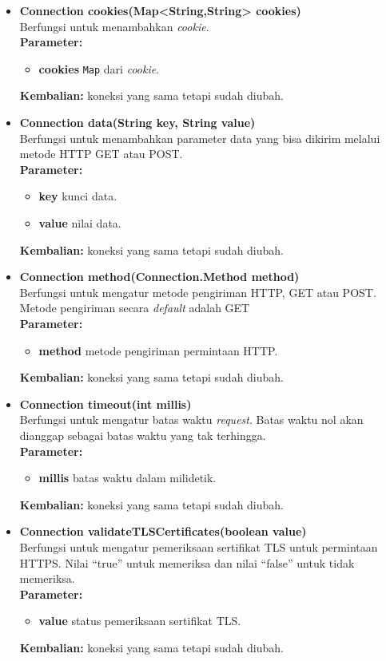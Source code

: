 \begin{itemize}
	\item \textbf{Connection cookies(Map<String,String> cookies)} \\
		Berfungsi untuk menambahkan \textit{cookie}. \\
		\textbf{Parameter:}
		\begin{itemize}
			\item \textbf{cookies} \texttt{Map} dari \textit{cookie}.
		\end{itemize}
		\textbf{Kembalian:} koneksi yang sama tetapi sudah diubah.
		
		\item \textbf{Connection data(String key, String value)} \\
		Berfungsi untuk menambahkan parameter data yang bisa dikirim melalui metode HTTP GET atau POST. \\
		\textbf{Parameter:}
		\begin{itemize}
			\item \textbf{key} kunci data.
			\item \textbf{value} nilai data.
		\end{itemize}
		\textbf{Kembalian:} koneksi yang sama tetapi sudah diubah.
		
		\item \textbf{Connection method(Connection.Method method)} \\
		Berfungsi untuk mengatur metode pengiriman HTTP, GET atau POST. Metode pengiriman secara \textit{default} adalah GET\\
		\textbf{Parameter:}
		\begin{itemize}
			\item \textbf{method} metode pengiriman permintaan HTTP.
		\end{itemize}
		\textbf{Kembalian:} koneksi yang sama tetapi sudah diubah.
		
		\item \textbf{Connection timeout(int millis)} \\
		Berfungsi untuk mengatur batas waktu \textit{request}. Batas waktu nol akan dianggap sebagai batas waktu yang tak terhingga. \\
		\textbf{Parameter:}
		\begin{itemize}
			\item \textbf{millis} batas waktu dalam milidetik.
		\end{itemize}
		\textbf{Kembalian:} koneksi yang sama tetapi sudah diubah.
		
		\item \textbf{Connection validateTLSCertificates(boolean value)} \\
		Berfungsi untuk mengatur pemeriksaan sertifikat TLS untuk permintaan HTTPS. Nilai ``true'' untuk memeriksa dan nilai ``false'' untuk tidak memeriksa.\\
		\textbf{Parameter:}
		\begin{itemize}
			\item \textbf{value} status pemeriksaan sertifikat TLS.
		\end{itemize}
		\textbf{Kembalian:} koneksi yang sama tetapi sudah diubah.
		

\end{itemize}
